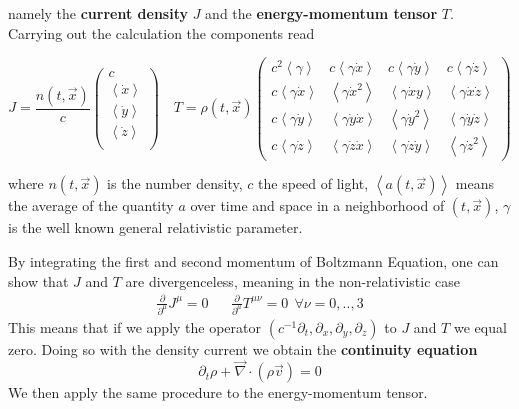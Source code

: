 namely the \textbf{current density} $J$ and the \textbf{energy-momentum tensor} $T$. Carrying out the calculation the components read 


\[
  J= \frac{n(t,\vec{x})}{c}
  \begin{pmatrix}
    c \\
    \left< \dot{x} \right> \\
    \left< \dot{y} \right> \\
    \left< \dot{z} \right> \\
  \end{pmatrix}\quad
  T= \rho(t,\vec{x})
  \begin{pmatrix}
    c^2 \left< \gamma \right> & c \left< \gamma \dot{x} \right> &  c \left< \gamma \dot{y} \right> & c \left< \gamma \dot{z} \right> \\
     c \left< \gamma \dot{x} \right> & \left< \gamma \dot{x}^2 \right> &  \left< \gamma \dot{x}y \right> &  \left< \gamma \dot{x} \dot{z} \right>  \\
     c \left< \gamma \dot{y} \right> &  \left< \gamma \dot{y} \dot{x} \right>&  \left< \gamma \dot{y}^2 \right> &  \left< \gamma \dot{y} \dot{z} \right>  \\
     c \left< \gamma \dot{z} \right> &  \left< \gamma \dot{z}\dot{x} \right>& \left< \gamma \dot{z}\dot{y} \right> &  \left< \gamma \dot{z}^2 \right> 
  \end{pmatrix}
\]

where $n(t, \vec{x})$ is the number density, $c$ the speed of light,  $\left< a(t,\vec{x}) \right>$ means the average of the quantity $a$ over time and space in a neighborhood of $(t, \vec{x})$, $\gamma$ is the well known general relativistic parameter.

By integrating the first and second momentum of Boltzmann Equation, one can show that $J$ and $T$ are divergenceless, meaning in the non-relativistic case
\begin{align}
\frac{\partial }{\partial^{\mu}}J^{\mu}=0 && \frac{\partial }{\partial^{\mu}}T^{\mu \nu}=0 \  \  \forall \nu =0,..,3 
\end{align}
This means that if we apply the operator $(c^{-1}\partial_t,\partial_x,\partial_y,\partial_z)$ to $J$ and $T$ we equal zero. Doing so with the density current we obtain the \textbf{continuity equation}
\begin{equation} \label{cont}
\partial_t \rho + \vec\nabla \cdot (\rho \vec{v})=0
\end{equation}
We then apply the same procedure to the energy-momentum tensor.

